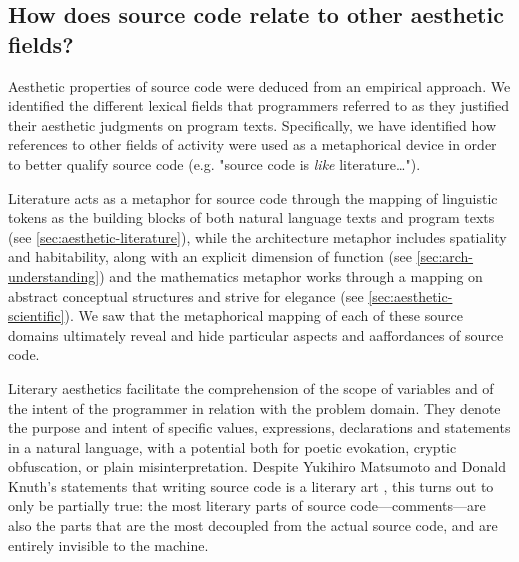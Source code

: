 \subsection{How does source code relate to other aesthetic fields?}
\label{subsec:conclusion-rq-2}

Aesthetic properties of source code were deduced from an empirical approach. We identified the different lexical fields that programmers referred to as they justified their aesthetic judgments on program texts. Specifically, we have identified how references to other fields of activity were used as a metaphorical device in order to better qualify source code (e.g. "source code is \emph{like} literature\dots").

Literature acts as a metaphor for source code through the mapping of linguistic tokens as the building blocks of both natural language texts and program texts (see \ref{sec:aesthetic-literature}), while the architecture metaphor includes spatiality and habitability, along with an explicit dimension of function (see \ref{sec:arch-understanding}) and the mathematics metaphor works through a mapping on abstract conceptual structures and strive for elegance (see \ref{sec:aesthetic-scientific}). We saw that the metaphorical mapping of each of these source domains ultimately reveal and hide particular aspects and aaffordances of source code.

Literary aesthetics facilitate the comprehension of the scope of variables and of the intent of the programmer in relation with the problem domain. They denote the purpose and intent of specific values, expressions, declarations and statements in a natural language, with a potential both for poetic evokation, cryptic obfuscation, or plain misinterpretation. Despite Yukihiro Matsumoto and Donald Knuth's statements that writing source code is a literary art \citep{knuth_literate_1984,matsumoto_treating_2007}, this turns out to only be partially true: the most literary parts of source code—comments—are also the parts that are the most decoupled from the actual source code, and are entirely invisible to the machine.

